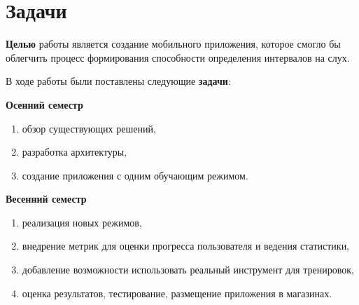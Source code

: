 \titleformat{\chapter}[display]
  {\normalfont\bfseries}{}{0pt}{\Huge}
\chapter{Задачи}

\textbf{Целью} работы является создание мобильного приложения, которое смогло бы облегчить процесс формирования способности определения интервалов на слух. \medskip\par
В ходе работы были поставлены следующие \textbf{задачи}:\par
\bigskip
\textbf{Осенний семестр}
\begin{enumerate}
\item обзор существующих решений,
\item разработка архитектуры,
\item создание приложения с одним обучающим режимом.
\end{enumerate}\par
\bigskip
\textbf{Весенний семестр} 
\begin{enumerate}
\item реализация новых режимов,
\item внедрение метрик для оценки прогресса пользователя и ведения статистики,
\item добавление возможности использовать реальный инструмент для тренировок,
\item оценка результатов, тестирование, размещение приложения в магазинах.
\end{enumerate}\par